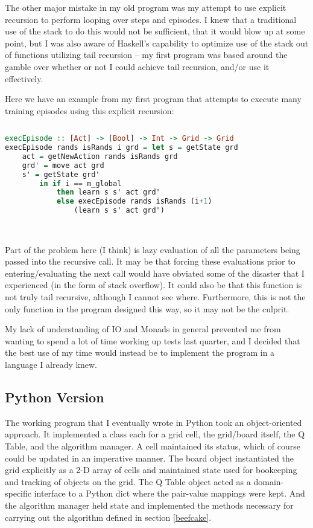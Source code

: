 \documentclass[12pt,a4paper]{article}
\begin{document}
		\par The other major mistake in my old program was my attempt to use explicit recursion to perform looping over steps and episodes. I knew that a traditional use of the stack to do this would not be sufficient, that it would blow up at some point, but I was also aware of Haskell's capability to optimize use of the stack out of functions utilizing tail recursion -- my first program was based around the gamble over whether or not I could achieve tail recursion, and/or use it effectively.
		\par Here we have an example from my first program that attempts to execute many training episodes using this explicit recursion:
		
		\begin{lstlisting}[language=Haskell,numbers=none]
		
execEpisode :: [Act] -> [Bool] -> Int -> Grid -> Grid
execEpisode rands isRands i grd = let s = getState grd
	act = getNewAction rands isRands grd
	grd' = move act grd
	s' = getState grd'
		in if i == m_global
			then learn s s' act grd'
			else execEpisode rands isRands (i+1) 
				(learn s s' act grd')

		\end{lstlisting}\ \\
		
		\par Part of the problem here (I think) is lazy evaluation of all the parameters being passed into the recursive call. It may be that forcing these evaluations prior to entering/evaluating the next call would have obviated some of the disaster that I experienced (in the form of stack overflow). It could also be that this function is not truly tail recursive, although I cannot see where. Furthermore, this is not the only function in the program designed this way, so it may not be the culprit. 
		\par My lack of understanding of IO and Monads in general prevented me from wanting to spend a lot of time working up tests last quarter, and I decided that the best use of my time would instead be to implement the program in a language I already knew.
		
		\subsection{Python Version}
		
		\par The working program that I eventually wrote in Python took an object-oriented approach. It implemented a class each for a grid cell, the grid/board itself, the Q Table, and the algorithm manager. A cell maintained its status, which of course could be updated in an imperative manner. The board object instantiated the grid explicitly as a 2-D array of cells and maintained state used for bookeeping and tracking of objects on the grid. The Q Table object acted as a domain-specific interface to a Python dict where the pair-value mappings were kept. And the algorithm manager held state and implemented the methods necessary for carrying out the algorithm defined in section \ref{beefcake}.
	
\end{document}
